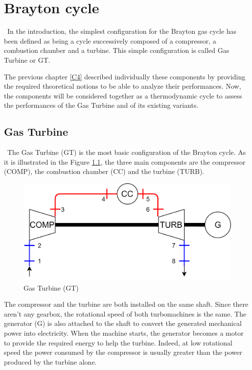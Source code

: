 \graphicspath{{Chapitre_5/Images/}}
\chapter{Brayton cycle}\label{C5}
\quad\, In the introduction, the simplest configuration for the Brayton gas cycle has been defined as being a cycle successively composed of a compressor, a combustion chamber and a turbine. This simple configuration is called Gas Turbine or GT. 

The previous chapter \ref{C4} described individually these components by providing the required theoretical notions to be able to analyze their performances. Now, the components will be considered together as a thermodynamic cycle to assess the performances of the Gas Turbine and of its existing variants.

\section{Gas Turbine}
\quad\, The Gas Turbine (GT) is the most basic configuration of the Brayton cycle. As it is illustrated in the Figure \ref{fig:C5_BraytonGT}, the three main components are the compressor (COMP), the combustion chamber (CC) and the turbine (TURB).

\begin{figure}[h]
\centering
\includegraphics[scale=0.15] {GT}
\caption{Gas Turbine (GT)}
\label{fig:C5_BraytonGT}
\end{figure}

The compressor and the turbine are both installed on the same shaft. Since there aren't any gearbox, the rotational speed of both turbomachines is the same. The generator (G) is also attached to the shaft to convert the generated mechanical power into electricity. 
When the machine starts, the generator becomes a motor to provide the required energy to help the turbine. Indeed, at low rotational speed the power consumed by the compressor is usually greater than the power produced by the turbine alone. 



